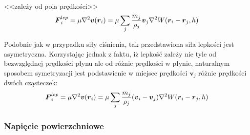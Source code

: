 \paragraph{}
<<zależy od pola prędkości>>
\begin{equation}
\boldsymbol{F}_i^{lep} = \mu \nabla^2 \boldsymbol{v}(\boldsymbol{r}_i) = \mu \sum\limits_{j} {m_j \over \rho_j} \boldsymbol{v}_j \nabla^2 W(\boldsymbol{r}_i-\boldsymbol{r}_j, h)
\label{eqn:sph_force_viscosity_1}
\end{equation}

Podobnie jak w przypadku siły ciśnienia, tak przedstawiona siła lepkości jest asymetryczna. Korzystając jednak z faktu, iż lepkość zależy nie tyle od bezwzględnej prędkości płynu ale od różnic prędkości w płynie, naturalnym sposobem symetryzacji jest podstawienie w miejsce prędkości $\boldsymbol{v}_j$ różnic prędkości dwóch cząsteczek:
\begin{equation}
\boldsymbol{F}_i^{lep} = \mu \nabla^2 \boldsymbol{v}(\boldsymbol{r}_i) = \mu \sum\limits_{j} {m_j \over \rho_j} (\boldsymbol{v}_i - \boldsymbol{v}_j) \nabla^2 W(\boldsymbol{r}_i-\boldsymbol{r}_j, h)
\label{eqn:sph_force_viscosity}
\end{equation}
\par

\subsubsection{Napięcie powierzchniowe}
\label{subsubsec:surface_tension}

